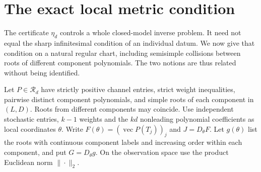 \section{The exact local metric condition}
\label{sec:local-condition}
The certificate $\eta_d$ controls a whole closed-model inverse problem.
It need not equal the sharp infinitesimal condition of an individual
datum. We now give that condition on a natural regular chart, including
semisimple collisions between roots of different component polynomials.
The two notions are thus related without being identified.

Let $P\in\mathcal R_d$ have strictly positive channel entries, strict
weight inequalities, pairwise distinct component polynomials, and simple
roots of each component in $(L,D)$. Roots from different components may
coincide. Use independent stochastic entries, $k-1$ weights and the
$kd$ nonleading polynomial coefficients as local coordinates $\theta$.
Write $F(\theta)=(\operatorname{vec}P(T_j))_j$ and
$J=D_\theta F$. Let $g(\theta)$ list the roots with continuous component
labels and increasing order within each component, and put $G=D_\theta g$.
On the observation space use the product Euclidean norm $\|\cdot\|_2$.

